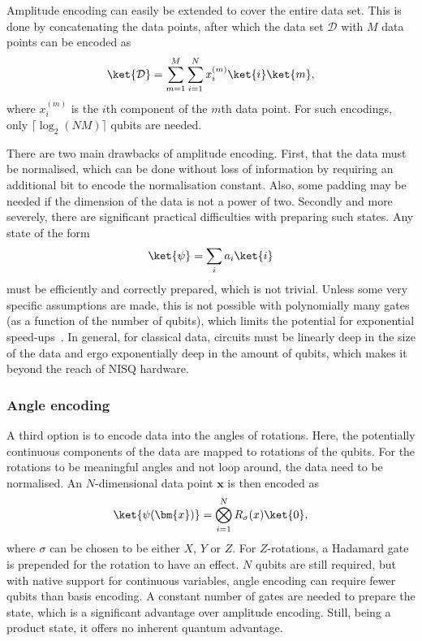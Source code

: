 Amplitude encoding can easily be extended to cover the entire data set.
This is done by concatenating the data points, after which the data set $\mathcal{D}$ with $M$ data points can be encoded as
\begin{equation}
  \ket{\mathcal{D}} = \sum_{m=1}^M \sum_{i=1}^{N} x_i^{(m)} \ket{i} \ket{m},
\end{equation}
where $x_i^{(m)}$ is the $i$th component of the $m$th data point.
For such encodings, only $\lceil \log_2 (N M) \rceil$ qubits are needed.

There are two main drawbacks of amplitude encoding.
First, that the data must be normalised, which can be done without loss of information by requiring an additional bit to encode the normalisation constant.
Also, some padding may be needed if the dimension of the data is not a power of two.
Secondly and more severely, there are significant practical difficulties with preparing such states.
Any state of the form
\begin{equation}
  \ket{\psi} = \sum_{i} a_i \ket{i}
\end{equation}
must be efficiently and correctly prepared, which is not trivial.
Unless some very specific assumptions are made, this is not possible with polynomially many gates (as a function of the number of qubits), which limits the potential for exponential speed-ups~\autocite{schuld2018}.
In general, for classical data, circuits must be linearly deep in the size of the data and ergo exponentially deep in the amount of qubits, which makes it beyond the reach of NISQ hardware.

\subsubsection{Angle encoding}
A third option is to encode data into the angles of rotations.
Here, the potentially continuous components of the data are mapped to rotations of the qubits.
For the rotations to be meaningful angles and not loop around, the data need to be normalised.
An $N$-dimensional data point $\bm{x}$ is then encoded as
\begin{equation}
  \ket{\psi(\bm{x})} = \bigotimes_{i=1}^{N} R_\sigma(x) \ket{0},
\end{equation}
where $\sigma$ can be chosen to be either $X$, $Y$ or $Z$.
For $Z$-rotations, a Hadamard gate is prepended for the rotation to have an effect.
$N$ qubits are still required, but with native support for continuous variables, angle encoding can require fewer qubits than basis encoding.
A constant number of gates are needed to prepare the state, which is a significant advantage over amplitude encoding.
Still, being a product state, it offers no inherent quantum advantage.


